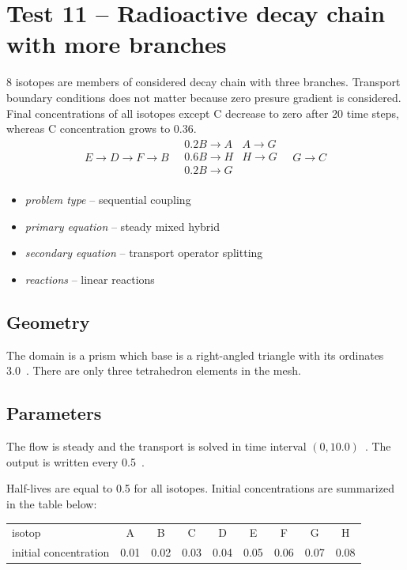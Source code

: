 
\section{Test 11 -- Radioactive decay chain with more branches}
8 isotopes are members of considered decay chain with three branches. Transport boundary conditions does not matter 
because zero presure gradient is considered. Final concentrations of all isotopes except C decrease to zero after 20 
time steps, whereas C concentration grows to 0.36.
\[
 E\xrightarrow{}D\xrightarrow{}F\xrightarrow{}B
 \quad
 \begin{matrix}
    0.2B\xrightarrow{}A & A\xrightarrow{}G \\
    0.6B\xrightarrow{}H & H\xrightarrow{}G \\
    0.2B\xrightarrow{}G &\\
 \end{matrix}
 \quad
 G\xrightarrow{}C 
\]

\begin{itemize} 
    \item \emph{problem type} -- sequential coupling
    \item \emph{primary equation} -- steady mixed hybrid
    \item \emph{secondary equation} -- transport operator splitting
    \item \emph{reactions} -- linear reactions
  \end{itemize}

\subsection*{Geometry}
The domain is a prism which base is a right-angled triangle with its ordinates 3.0~. 
There are only three tetrahedron elements in the mesh.

\subsection*{Parameters}
The flow is steady and the transport is solved in time interval $(0,10.0)$~. The output is written every 0.5~.

Half-lives are equal to 0.5 for all isotopes. Initial concentrations are summarized in the table below:
  \begin{center}
    \begin{tabular}[c]{|l|c|c|c|c|c|c|c|c|}
      \hline
      isotop & A & B  & C & D & E & F & G & H \\[4pt]
      initial concentration & 0.01 & 0.02 & 0.03 & 0.04 & 0.05 & 0.06 & 0.07 & 0.08 \\[4pt]
      \hline
    \end{tabular}
  \end{center}


